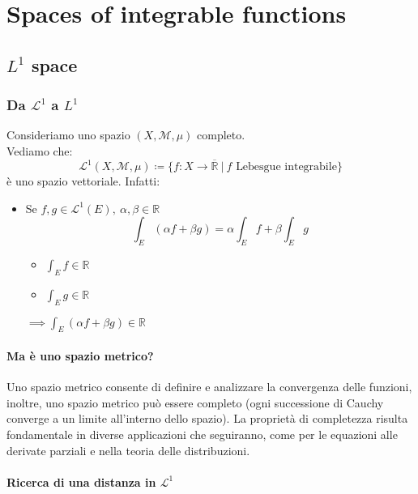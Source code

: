 \section{Spaces of integrable functions}
\subsection{$L^1$ space}
\subsubsection{Da $\mathcal L^1$ a $L^1$}
Consideriamo uno spazio $(X,\mathcal M,\mu)$ completo. \\
Vediamo che:
$$\mathcal L^1(X,\mathcal M,\mu)\coloneqq\{f:X\to \overline{\mathbb R}\ |\  f \text{ Lebesgue integrabile}\}$$
è uno spazio vettoriale. Infatti:
\begin{itemize}
    \item Se $f,g\in \mathcal L^1(E),\ \alpha, \beta \in \mathbb R$\\
     $$\int_E (\alpha f+\beta g)=\alpha \int_E f + \beta \int_E g$$
     \begin{itemize}
         \item $\int_E f\in \mathbb R$
         \item $\int_E g \in \mathbb R$
     \end{itemize}
     $\implies \int_E (\alpha f+\beta g)\in \mathbb R$
\end{itemize}
\paragraph{Ma è uno spazio metrico?}
Uno spazio metrico consente di definire e analizzare la convergenza delle funzioni, inoltre, uno spazio metrico può essere completo (ogni successione di Cauchy converge a un limite all'interno dello spazio). La proprietà di completezza risulta fondamentale in diverse applicazioni che seguiranno, come per le equazioni alle derivate parziali e nella teoria delle distribuzioni.
\paragraph{Ricerca di una distanza in $\mathcal L^1$}

